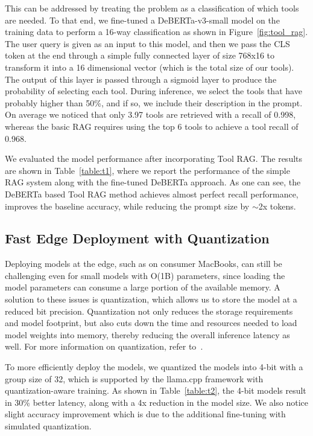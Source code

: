 This can be addressed by treating the problem as a classification of which tools are needed. To that end, we fine-tuned a DeBERTa-v3-small \cite{he2021debertav3} model on the training data to perform a 16-way classification as shown in Figure~\ref{fig:tool_rag}. The user query is given as an input to this model, and then we pass the CLS token at the end through a simple fully connected layer of size 768x16 to transform it into a 16 dimensional vector (which is the total size of our tools). The output of this layer is passed through a sigmoid layer to produce the probability of selecting each tool. During inference, we select the tools that have probably higher than 50\%, and if so, we include their description in the prompt. On average we noticed that only 3.97 tools are retrieved with a recall of 0.998, whereas the basic RAG requires using the top 6 tools to achieve a tool recall of 0.968.

We evaluated the model performance after incorporating Tool RAG. The results are shown in Table~\ref{table:t1}, where we report the performance of the simple RAG system along with the fine-tuned DeBERTa approach. As one can see, the DeBERTa based Tool RAG method achieves almost perfect recall performance, improves the baseline accuracy, while reducing the prompt size by $\sim$2x tokens.



\subsection{Fast Edge Deployment with Quantization}

Deploying models at the edge, such as on consumer MacBooks, can still be challenging even for small models with O(1B) parameters, since loading the model parameters can consume a large portion of the available memory. A solution to these issues is quantization, which allows us to store the model at a reduced bit precision. Quantization not only reduces the storage requirements and model footprint, but also cuts down the time and resources needed to load model weights into memory, thereby reducing the overall inference latency as well.
For more information on quantization, refer to~\cite{gholami2022survey}.

To more efficiently deploy the models, we quantized the models into 4-bit with a group size of 32, which is supported by the llama.cpp framework with quantization-aware training. As shown in Table~\ref{table:t2}, the 4-bit models result in 30\% better latency, along with a 4x reduction in the model size. We also notice slight accuracy improvement which is due to the additional fine-tuning with simulated quantization.

